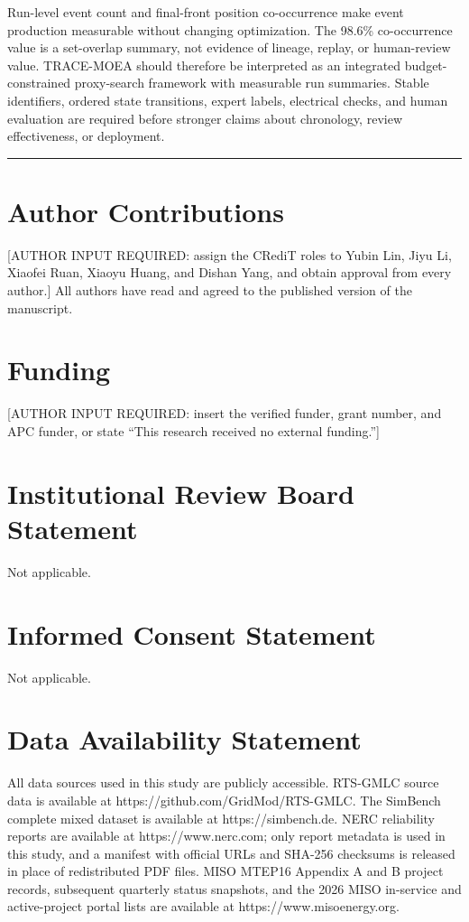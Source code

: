 \documentclass[energies,article,submit,moreauthors]{Definitions/mdpi}
\begin{document}
Run-level event count and final-front position co-occurrence make event production measurable without changing optimization. The 98.6\% co-occurrence value is a set-overlap summary, not evidence of lineage, replay, or human-review value. TRACE-MOEA should therefore be interpreted as an integrated budget-constrained proxy-search framework with measurable run summaries. Stable identifiers, ordered state transitions, expert labels, electrical checks, and human evaluation are required before stronger claims about chronology, review effectiveness, or deployment.

\begin{center}\rule{0.5\linewidth}{0.5pt}\end{center}

\section*{Author Contributions}

{[}AUTHOR INPUT REQUIRED: assign the CRediT roles to Yubin Lin, Jiyu Li, Xiaofei Ruan, Xiaoyu Huang, and Dishan Yang, and obtain approval from every author.{]} All authors have read and agreed to the published version of the manuscript.

\section*{Funding}

{[}AUTHOR INPUT REQUIRED: insert the verified funder, grant number, and APC funder, or state ``This research received no external funding.''{]}

\section*{Institutional Review Board Statement}

Not applicable.

\section*{Informed Consent Statement}

Not applicable.

\section*{Data Availability Statement}

All data sources used in this study are publicly accessible. RTS-GMLC source data is available at https://github.com/GridMod/RTS-GMLC. The SimBench complete mixed dataset is available at https://simbench.de. NERC reliability reports are available at https://www.nerc.com; only report metadata is used in this study, and a manifest with official URLs and SHA-256 checksums is released in place of redistributed PDF files. MISO MTEP16 Appendix A and B project records, subsequent quarterly status snapshots, and the 2026 MISO in-service and active-project portal lists are available at https://www.misoenergy.org.
\end{document}
